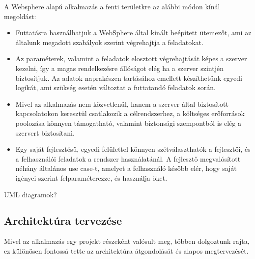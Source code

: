 
A Websphere alapú alkalmazás a fenti területkre az alábbi módon kínál megoldást:
\begin{itemize}
	\item Futtatásra használhatjuk a WebSphere által kínált beépített ütemezőt, ami az általunk megadott szabályok szerint végrehajtja a feladatokat.
	
	\item Az paraméterek, valamint a feladatok elosztott végrehajtását képes a szerver kezelni, így a magas rendelkezésre állóságot elég ha a szerver szintjén biztosítjuk. Az adatok naprakészen tartásához emellett készíthetünk egyedi logikát, ami szükség esetén változtat a futtatandó feladatok során.
	
	\item Mivel az alkalmazás nem közvetlenül, hanem a szerver által biztosított kapcsolatokon keresztül csatlakozik a célrendszerhez, a költséges erőforrások poolozása könnyen támogatható, valamint biztonsági szempontból is elég a szervert biztosítani.
	
	\item Egy saját fejlesztésű, egyedi felülettel könnyen szétválaszthatók a fejlesztői, és a felhasználói feladatok a rendszer használatánál. A fejlesztő megvalósított néhány általános use case-t, amelyet a felhasználó később elér, hogy saját igényei szerint felparaméterezze, és használja őket. 
	
\end{itemize}

\todo UML diagramok?
\subsection{Architektúra tervezése}

Mivel az alkalmazás egy projekt részeként valósult meg, többen dolgoztunk rajta, ez különösen fontossá tette az architektúra átgondolását és alapos megtervezését. 

